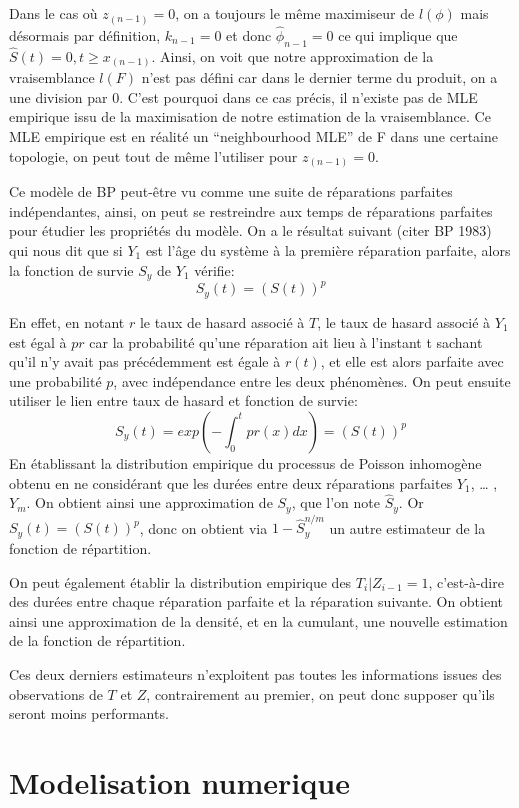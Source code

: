 \documentclass[
]{article}
\begin{document}
Dans le cas où \(z_{(n-1)}=0\), on a toujours le même maximiseur de
\(l(\phi)\) mais désormais par définition, \(k_{n-1}=0\) et donc
\(\hat\phi_{n-1}=0\) ce qui implique que
\(\hat S(t)=0, t \geq x_{(n-1)}\). Ainsi, on voit que notre
approximation de la vraisemblance \(l(F)\) n'est pas défini car dans le
dernier terme du produit, on a une division par 0. C'est pourquoi dans
ce cas précis, il n'existe pas de MLE empirique issu de la maximisation
de notre estimation de la vraisemblance. Ce MLE empirique est en réalité
un ``neighbourhood MLE'' de F dans une certaine topologie, on peut tout
de même l'utiliser pour \(z_{(n-1)}=0\).

Ce modèle de BP peut-être vu comme une suite de réparations parfaites
indépendantes, ainsi, on peut se restreindre aux temps de réparations
parfaites pour étudier les propriétés du modèle. On a le résultat
suivant (citer BP 1983) qui nous dit que si \(Y_1\) est l'âge du système
à la première réparation parfaite, alors la fonction de survie \(S_y\)
de \(Y_1\) vérifie: \[
S_y(t)=(S(t))^p
\]

En effet, en notant \(r\) le taux de hasard associé à \(T\), le taux de
hasard associé à \(Y_1\) est égal à \(pr\) car la probabilité qu'une
réparation ait lieu à l'instant t sachant qu'il n'y avait pas
précédemment est égale à \(r(t)\), et elle est alors parfaite avec une
probabilité \(p\), avec indépendance entre les deux phénomènes. On peut
ensuite utiliser le lien entre taux de hasard et fonction de survie: \[
S_y(t)=exp(-\int_0^t p r(x) dx)=(S(t))^p
\] En établissant la distribution empirique du processus de Poisson
inhomogène obtenu en ne considérant que les durées entre deux
réparations parfaites \(Y_1\), \ldots{} , \(Y_m\). On obtient ainsi une
approximation de \(S_y\), que l'on note \(\hat S_y\). Or
\(S_y(t)=(S(t))^p\), donc on obtient via \(1 - \hat S_y ^{n/m}\) un
autre estimateur de la fonction de répartition.

On peut également établir la distribution empirique des
\(T_i | Z_{i-1} = 1\), c'est-à-dire des durées entre chaque réparation
parfaite et la réparation suivante. On obtient ainsi une approximation
de la densité, et en la cumulant, une nouvelle estimation de la fonction
de répartition.

Ces deux derniers estimateurs n'exploitent pas toutes les informations
issues des observations de \(T\) et \(Z\), contrairement au premier, on
peut donc supposer qu'ils seront moins performants.

\section{Modelisation numerique}\label{modelisation-numerique}
\end{document}
